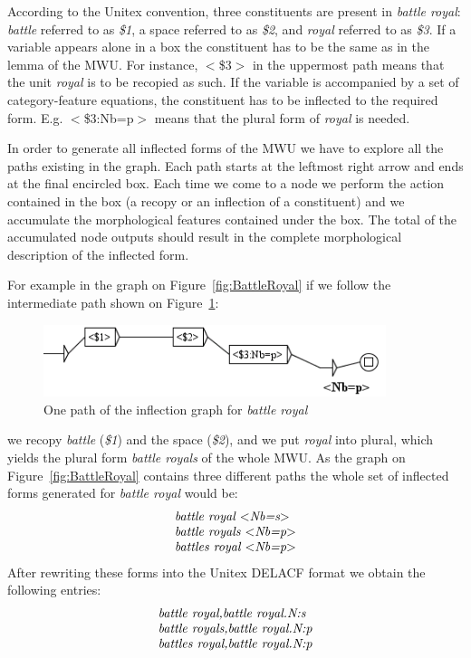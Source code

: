 \bigskip
\noindent According to the Unitex convention, three constituents are present 
in \emph{battle royal}: \emph{battle} referred to as \emph{\$1}, a space referred 
to as \emph{\$2}, and \emph{royal} referred to as \emph{\$3}. If a variable appears 
alone in a box the constituent has to be the same as in the lemma of the MWU. For 
instance, $<$\$3$>$ in the uppermost path means that the unit \emph{royal} is to be 
recopied as such. If the variable is accompanied by a set of category-feature equations, 
the constituent has to be inflected to the required form. E.g.  $<$\$3:Nb=p$>$ means that 
the plural form of \emph{royal} is needed. 

\bigskip
\noindent In order to generate all inflected forms of the MWU we have to explore all 
the paths existing in the graph. Each path starts at the leftmost right arrow and ends 
at the final encircled box. Each time we come to a node we perform the action contained 
in the box (a recopy or an inflection of a constituent) and we accumulate the morphological 
features contained under the box. The total of the accumulated node outputs should result in 
the complete morphological description of the inflected form.

\bigskip
\noindent For example in the graph on Figure~\ref{fig:BattleRoyal} if we
follow the intermediate path shown on Figure~\ref{fig:BattleRoyalonepath}:

\begin{figure}[!htb]
  \centering
  \includegraphics[width=10cm]{resources/img/BattleRoyalonepath.png}
  \caption{One path of the inflection graph for \emph{battle royal}}
  \label{fig:BattleRoyalonepath}
\end{figure}

\bigskip
\noindent we recopy \emph{battle} (\emph{\$1}) and the space (\emph{\$2}), and we put \emph{royal} 
into plural, which yields the plural form  \emph{battle royals} of the whole MWU. As the graph 
on Figure~\ref{fig:BattleRoyal} contains three different paths the whole set of inflected forms 
generated for \emph{battle royal} would be: 
\[
\begin{array}[l]{l}
\emph{battle royal $<$Nb=s$>$} \\
\emph{battle royals $<$Nb=p$>$} \\
\emph{battles royal $<$Nb=p$>$}
\end{array}
\]
\bigskip
\noindent After rewriting these forms into the Unitex DELACF format we obtain
the following entries:
\[
\begin{array}[l]{l}
\emph{battle royal,battle royal.N:s} \\
\emph{battle royals,battle royal.N:p} \\
\emph{battles royal,battle royal.N:p}
\end{array}
\]

